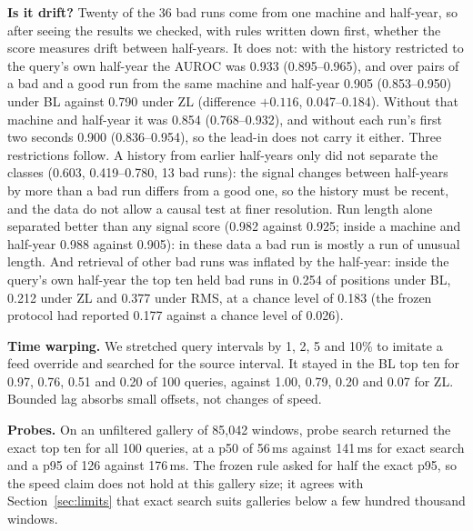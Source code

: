 \documentclass[sigconf]{acmart}
\begin{document}
\textbf{Is it drift?} Twenty of the 36 bad runs come from one machine and half-year, so after seeing the results we
checked, with rules written down first, whether the score measures drift between half-years. It does not: with the
history restricted to the query's own half-year the AUROC was 0.933 (0.895--0.965), and over pairs of a bad and a good
run from the same machine and half-year 0.905 (0.853--0.950) under BL against 0.790 under ZL (difference $+0.116$,
0.047--0.184). Without that machine and half-year it was 0.854 (0.768--0.932), and without each run's first two seconds 0.900
(0.836--0.954), so the lead-in does not carry it either. Three restrictions follow. A history
from earlier half-years only did not separate the classes (0.603, 0.419--0.780, 13 bad runs): the signal changes
between half-years by more than a bad run differs from a good one, so the history must be recent, and the data do not
allow a causal test at finer resolution. Run length alone separated better than any signal score (0.982 against 0.925;
inside a machine and half-year 0.988 against 0.905): in these data a bad run is mostly a run of unusual length.
And retrieval of other bad runs was inflated by the half-year: inside the query's own half-year the top ten held bad
runs in 0.254 of positions under BL, 0.212 under ZL and 0.377 under RMS, at a chance level of 0.183 (the frozen
protocol had reported 0.177 against a chance level of 0.026).

\textbf{Time warping.} We stretched query intervals by 1, 2, 5 and 10\% to imitate a feed override and searched for
the source interval. It stayed in the BL top ten for 0.97, 0.76, 0.51 and 0.20 of 100 queries, against 1.00, 0.79,
0.20 and 0.07 for ZL. Bounded lag absorbs small offsets, not changes of speed.

\textbf{Probes.} On an unfiltered gallery of 85,042 windows, probe search returned the exact top ten for all 100
queries, at a p50 of 56\,ms against 141\,ms for exact search and a p95 of 126 against 176\,ms. The frozen rule asked
for half the exact p95, so the speed claim does not hold at this gallery size; it agrees with Section~\ref{sec:limits}
that exact search suits galleries below a few hundred thousand windows.
\end{document}
